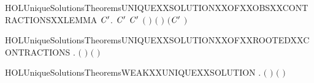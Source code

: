 \begin{SaveVerbatim}{HOLUniqueSolutionsTheoremsUNIQUEXXSOLUTIONXXOFXXOBSXXCONTRACTIONSXXLEMMA}
                 \HOLTokenWeakTransBegin\HOLConst{\ensuremath{\tau}}\HOLTokenWeakTransEnd {} \HOLSymConst{\HOLTokenImp{}}
               \HOLSymConst{\HOLTokenExists{}}\ensuremath{\HOLBoundVar{C}\sp{\prime}}.
                    \ensuremath{\HOLBoundVar{C}\sp{\prime}} \HOLSymConst{\HOLTokenConj{}}   \ensuremath{\HOLBoundVar{C}\sp{\prime}}  \HOLSymConst{\HOLTokenConj{}}
                   \ensuremath{(}  \ensuremath{)} \ensuremath{(} \ensuremath{)} \ensuremath{(}\ensuremath{\HOLBoundVar{C}\sp{\prime}} \ensuremath{)}
\end{SaveVerbatim}
\newcommand{\HOLUniqueSolutionsTheoremsUNIQUEXXSOLUTIONXXOFXXOBSXXCONTRACTIONSXXLEMMA}{\UseVerbatim{HOLUniqueSolutionsTheoremsUNIQUEXXSOLUTIONXXOFXXOBSXXCONTRACTIONSXXLEMMA}}
\begin{SaveVerbatim}{HOLUniqueSolutionsTheoremsUNIQUEXXSOLUTIONXXOFXXROOTEDXXCONTRACTIONS}
\HOLTokenTurnstile{} \HOLSymConst{\HOLTokenForall{}}  .
         \HOLSymConst{\HOLTokenConj{}}   \ensuremath{(} \ensuremath{)} \HOLSymConst{\HOLTokenConj{}}   \ensuremath{(} \ensuremath{)} \HOLSymConst{\HOLTokenImp{}}
         
\end{SaveVerbatim}
\newcommand{\HOLUniqueSolutionsTheoremsUNIQUEXXSOLUTIONXXOFXXROOTEDXXCONTRACTIONS}{\UseVerbatim{HOLUniqueSolutionsTheoremsUNIQUEXXSOLUTIONXXOFXXROOTEDXXCONTRACTIONS}}
\begin{SaveVerbatim}{HOLUniqueSolutionsTheoremsWEAKXXUNIQUEXXSOLUTION}
\HOLTokenTurnstile{} \HOLSymConst{\HOLTokenForall{}}  .
         \HOLSymConst{\HOLTokenConj{}}   \HOLSymConst{\HOLTokenConj{}}   \ensuremath{(} \ensuremath{)} \HOLSymConst{\HOLTokenConj{}}   \ensuremath{(} \ensuremath{)} \HOLSymConst{\HOLTokenImp{}}
         
\end{SaveVerbatim}
\newcommand{\HOLUniqueSolutionsTheoremsWEAKXXUNIQUEXXSOLUTION}{\UseVerbatim{HOLUniqueSolutionsTheoremsWEAKXXUNIQUEXXSOLUTION}}
